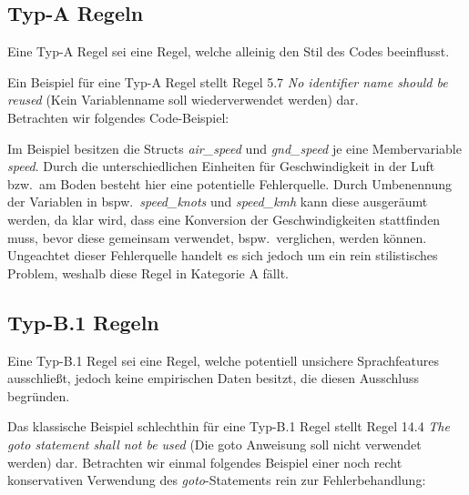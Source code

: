 \documentclass[a4paper,UKenglish,cleveref, autoref]{templates/lipics-v2019}
\begin{document}
    \subsection{Typ-A Regeln}
    \label{subsec:typ-a-regeln}
    \begin{definition}
        Eine Typ-A Regel sei eine Regel, welche alleinig den Stil des Codes beeinflusst.
    \end{definition}

    Ein Beispiel für eine Typ-A Regel stellt Regel 5.7 \textit{No identifier name should be reused}
    (Kein Variablenname soll wiederverwendet werden) dar.\\
    Betrachten wir folgendes Code-Beispiel:

    \noindent
    \begin{minipage}{\linewidth}
        \begin{example}
            
        \end{example}
    \end{minipage}

    Im Beispiel besitzen die Structs \textit{air\_speed} und \textit{gnd\_speed} je eine Membervariable \textit{speed}.
    Durch die unterschiedlichen Einheiten für Geschwindigkeit in der Luft bzw.\ am Boden besteht hier eine potentielle
    Fehlerquelle.
    Durch Umbenennung der Variablen in bspw.\ \textit{speed\_knots} und \textit{speed\_kmh} kann diese ausgeräumt werden,
    da klar wird, dass eine Konversion der Geschwindigkeiten stattfinden muss, bevor diese gemeinsam verwendet, bspw.\ verglichen,
    werden können.
    Ungeachtet dieser Fehlerquelle handelt es sich jedoch um ein rein stilistisches Problem, weshalb diese Regel in
    Kategorie A fällt.

    \subsection{Typ-B.1 Regeln}
    \label{subsec:typ-b-1-regeln}
    \begin{definition}
        Eine Typ-B.1 Regel sei eine Regel, welche potentiell unsichere Sprachfeatures ausschließt,
        jedoch keine empirischen Daten besitzt, die diesen Ausschluss begründen.
    \end{definition}

    Das klassische Beispiel schlechthin für eine Typ-B.1 Regel stellt Regel 14.4 \textit{The goto statement shall not be used}
    (Die goto Anweisung soll nicht verwendet werden) dar.
    Betrachten wir einmal folgendes Beispiel einer noch recht konservativen Verwendung des \textit{goto}-Statements rein zur
    Fehlerbehandlung:
\end{document}
